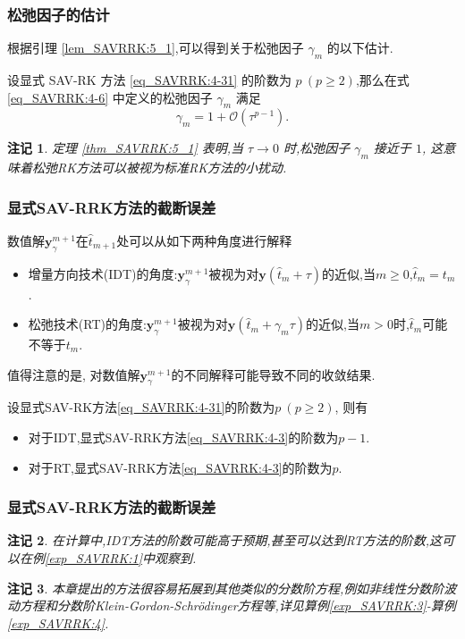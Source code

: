 \documentclass[aspectratio=169]{beamer}
\newtheorem{remark}{注记}[section] %
\numberwithin{theorem}{section} %
\numberwithin{equation}{section}%
\numberwithin{figure}{section}%
\numberwithin{table}{section}%
\begin{document}
\begin{frame}\frametitle{松弛因子的估计}

	\noindent 根据引理 \ref{lem_SAVRRK:5_1},可以得到关于松弛因子 $\gamma_m$ 的以下估计.

	\begin{theorem}\label{thm_SAVRRK:5_1}
	设显式 SAV-RK 方法 \eqref{eq_SAVRRK:4-31} 的阶数为 $p~(p \geq 2)$,那么在式 \eqref{eq_SAVRRK:4-6} 中定义的松弛因子 $\gamma_m$ 满足
	\begin{equation}\label{eq_SAVRRK:5_3}
	\gamma_m=1+\mathcal{O}(\tau^{p-1}).
	\end{equation}
	\end{theorem}	
	\begin{remark}\label{rk_SAVRRK:5_1}
		定理 \ref{thm_SAVRRK:5_1} 表明,当 $\tau\rightarrow 0$ 时,松弛因子 $\gamma_m$ 接近于 $1$,
		这意味着松弛RK方法可以被视为标准RK方法的小扰动.
		\end{remark}
\end{frame}
\begin{frame}\frametitle{显式SAV-RRK方法的截断误差}
	\noindent 数值解$\bm{y}_\gamma^{m+1}$在$\hat{t}_{m+1}$处可以从如下两种角度进行解释\cite{ketchesonRelaxationRungeKutta2019}%
	\begin{itemize}
	\item 增量方向技术(IDT)的角度:\quad$\bm{y}_\gamma^{m+1}$被视为对$\bm{y}\left(\hat{t}_m+\tau\right)$的近似,当$m \geq 0$,$\hat{t}_m=t_m$.
	\item 松弛技术(RT)的角度:\quad$\bm{y}_\gamma^{m+1}$被视为对$\bm{y}\left(\hat{t}_m+\gamma_m \tau\right)$的近似,当$m>0$时,$\hat{t}_m$可能不等于$t_m$.
	\end{itemize}
	\noindent 值得注意的是, 对数值解$\bm{y}_\gamma^{m+1}$的不同解释可能导致不同的收敛结果.
	\begin{theorem}\label{thm_SAVRRK:5_4}
		设显式SAV-RK方法\eqref{eq_SAVRRK:4-31}的阶数为$p~(p \geq 2)$, 则有
		\begin{itemize}
		\item 对于IDT,显式SAV-RRK方法\eqref{eq_SAVRRK:4-3}的阶数为$p-1$.
		\item 对于RT,显式SAV-RRK方法\eqref{eq_SAVRRK:4-3}的阶数为$p$.
		\end{itemize}
		\end{theorem}
	\end{frame}

\begin{frame}\frametitle{显式SAV-RRK方法的截断误差}
	
	\begin{remark}\label{rk_SAVRRK:5_5}
		在计算中,IDT方法的阶数可能高于预期,甚至可以达到RT方法的阶数,这可以在例\ref{exp_SAVRRK:1}中观察到.
		\end{remark}
		\begin{remark}\label{rk_SAVRRK:5_6}
			本章提出的方法很容易拓展到其他类似的分数阶方程,例如非线性分数阶波动方程和分数阶Klein-Gordon-Schr{\"o}dinger方程等,详见算例\ref{exp_SAVRRK:3}-算例\ref{exp_SAVRRK:4}.
			\end{remark}
\end{frame}
\end{document}
